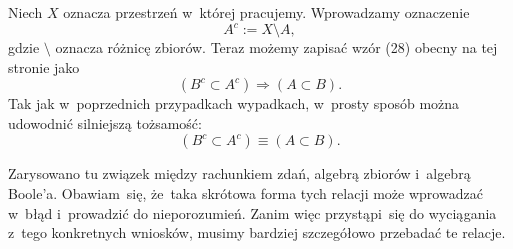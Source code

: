 \documentclass[a4paper,11pt]{article}
\begin{document}
 Niech $X$ oznacza przestrzeń w~której pracujemy. Wprowadzamy oznaczenie
\begin{equation}
  \label{eq:Kuratowski-Wstep-do-teorii-mnogosci-ETC-08}
  A^{ c } := X \setminus A,
\end{equation}
gdzie $\setminus$ oznacza różnicę zbiorów. Teraz możemy zapisać wzór (28)
obecny na tej stronie jako
\begin{equation}
  \label{eq:Kuratowski-Wstep-do-teorii-mnogosci-ETC-09}
  ( B^{ c } \subset A^{ c } ) \Rightarrow ( A \subset B ).
\end{equation}
Tak jak w~poprzednich przypadkach wypadkach, w~prosty sposób można
udowodnić silniejszą tożsamość:
\begin{equation}
  \label{eq:Kuratowski-Wstep-do-teorii-mnogosci-ETC-10}
  ( B^{ c } \subset A^{ c } ) \equiv ( A \subset B ).
\end{equation}

\vspace{\spaceFour}





 Zarysowano tu związek między rachunkiem zdań, algebrą zbiorów i~algebrą Boole'a.
Obawiam~się, że~taka skrótowa forma tych relacji może wprowadzać w~błąd i~prowadzić do nieporozumień.
Zanim więc przystąpi~się do wyciągania z~tego konkretnych wniosków, musimy bardziej szczegółowo
przebadać te relacje.

\vspace{\spaceFour}














\vspace{\spaceFive}
\end{document}
